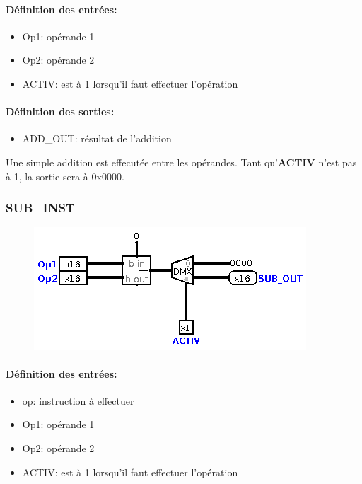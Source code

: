\documentclass[a4paper]{article} %
\begin{document}
\paragraph{Définition des entrées:}
\begin{itemize}
    \item     Op1: opérande 1
    \item     Op2: opérande 2
    \item     ACTIV: est à 1 lorsqu'il faut effectuer l'opération
\end{itemize}

\paragraph{Définition des sorties:}
\begin{itemize}
    \item     ADD\_OUT: résultat de l'addition
\end{itemize}
\medskip
Une simple addition est effecutée entre les opérandes. Tant qu'\textbf{ACTIV} n'est pas à 1, la sortie sera à 0x0000.


\subsubsection{SUB\_INST}
\begin{figure}[H]
    \centering
    \includegraphics[width=.8\textwidth]{src/SUB_INST.png}
    \label{fig:sub_inst_pic}
\end{figure}
\paragraph{Définition des entrées:}
\begin{itemize}
    \item     op: instruction à effectuer
    \item     Op1: opérande 1
    \item     Op2: opérande 2
    \item     ACTIV: est à 1 lorsqu'il faut effectuer l'opération
\end{itemize}
\end{document}
